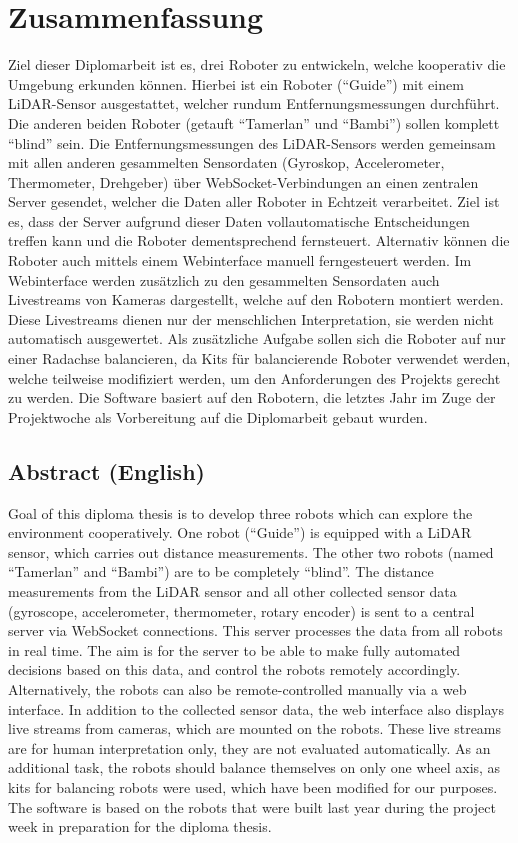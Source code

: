 
\chapter{Zusammenfassung}
Ziel dieser Diplomarbeit ist es, drei Roboter zu entwickeln,
welche kooperativ die Umgebung erkunden können.
%
Hierbei ist ein Roboter (``Guide'') mit einem LiDAR-Sensor ausgestattet,
welcher rundum Entfernungsmessungen durchführt.
%
Die anderen beiden Roboter (getauft ``Tamerlan'' und ``Bambi'')
sollen komplett ``blind'' sein.
%
Die Entfernungsmessungen des LiDAR-Sensors werden
gemeinsam mit allen anderen gesammelten Sensordaten
(Gyroskop, Accelerometer, Thermometer, Drehgeber)
über WebSocket-Verbindungen an einen zentralen Server gesendet,
welcher die Daten aller Roboter in Echtzeit verarbeitet.
%
Ziel ist es, dass der Server aufgrund dieser Daten
vollautomatische Entscheidungen treffen kann und die Roboter dementsprechend fernsteuert.
%
Alternativ können die Roboter auch mittels einem Webinterface manuell ferngesteuert werden.
%
Im Webinterface werden zusätzlich zu den gesammelten Sensordaten
auch Livestreams von Kameras dargestellt,
welche auf den Robotern montiert werden.
%
Diese Livestreams dienen nur der menschlichen Interpretation,
sie werden nicht automatisch ausgewertet.
%
Als zusätzliche Aufgabe sollen sich die Roboter auf nur einer Radachse balancieren,
da Kits für balancierende Roboter verwendet werden,
welche teilweise modifiziert werden,
um den Anforderungen des Projekts gerecht zu werden.
%
Die Software basiert auf den Robotern,
die letztes Jahr im Zuge der Projektwoche als Vorbereitung auf die Diplomarbeit gebaut wurden.

\section{Abstract (English)}
Goal of this diploma thesis is to develop three robots which
can explore the environment cooperatively.
%
One robot (``Guide'') is equipped with a LiDAR sensor,
which carries out distance measurements.
%
The other two robots (named ``Tamerlan'' and ``Bambi'')
are to be completely ``blind''.
%
The distance measurements from the LiDAR sensor and all other collected sensor data
(gyroscope, accelerometer, thermometer, rotary encoder)
is sent to a central server via WebSocket connections.
This server processes the data from all robots in real time.
%
The aim is for the server to be able to make fully automated decisions based on this data,
and control the robots remotely accordingly.
%
Alternatively, the robots can also be remote-controlled manually via a web interface.
%
In addition to the collected sensor data, the web interface
also displays live streams from cameras,
which are mounted on the robots.
%
These live streams are for human interpretation only,
they are not evaluated automatically.
%
As an additional task, the robots should balance themselves on only one wheel axis,
as kits for balancing robots were used,
which have been modified for our purposes.
The software is based on the robots
that were built last year during the project week in preparation for the diploma thesis.
